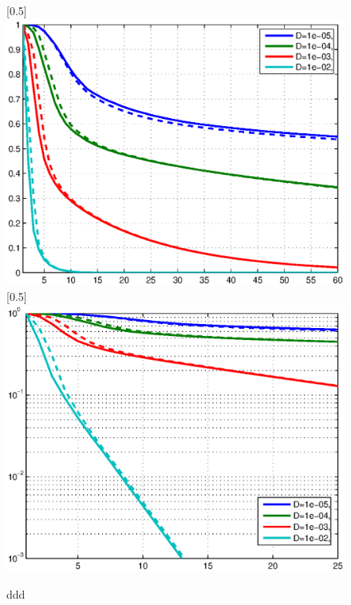 \documentclass{article}
\begin{document}
\begin{figure}
 \centerline{
  \scalebox{0.5}[0.5]{\includegraphics{PrchangeD.eps}}
  \scalebox{0.5}[0.5]{\includegraphics{PrchangeDlog.eps}}
} \caption{ddd}
  \label{PrchangeD}
\end{figure}
\end{document}
